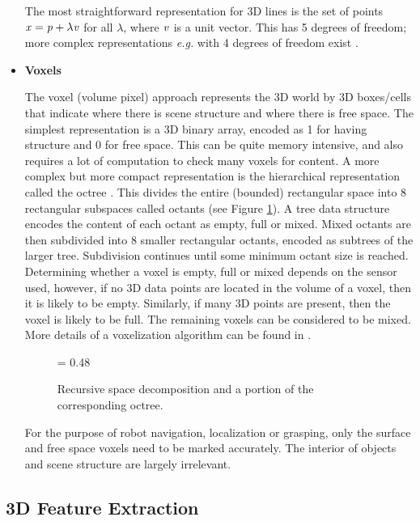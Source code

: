 \documentclass[twocolumn,oneside]{book}
\begin{document}
\begin{itemize}
The most straightforward representation for 3D lines is 
the set of points $ {\bf \it x} = {\bf \it p} + \lambda {\bf \it v}$ for all $\lambda$,
where ${\bf \it v}$ is a unit vector.
This has 5 degrees of freedom; more complex representations {\it e.g.} with
4 degrees of freedom exist \cite{hartley}.

\item {\bf Voxels}

The  voxel (volume pixel) approach represents the 3D world by 3D boxes/cells that
indicate where there is scene structure and where there is free space.
The simplest representation is a 3D binary array, encoded as 1 for having
structure and 0 for free space.
This can be quite memory intensive, and also requires a lot of computation to
check many voxels for content.
A more complex but more compact representation is the hierarchical 
representation called the octree \cite{foley}. This divides the entire (bounded)
rectangular space into 8 rectangular subspaces called octants 
(see Figure \ref{octree}).
A tree data structure encodes the content of each octant as empty,
full or mixed.
Mixed octants are then subdivided into 8 smaller rectangular octants,
encoded as subtrees of the larger tree.
Subdivision continues until some minimum octant size is reached.
Determining whether a voxel is empty, full or mixed depends on the sensor
used, however, if no 3D data points are located in the volume of a
voxel, then it is likely to be empty.
Similarly, if many 3D points are present, then the voxel is likely to 
be full.
The remaining voxels can be considered to be mixed.
More details of a voxelization algorithm can be found in \cite{Curless}.
\begin{figure}[htb]
{\epsfxsize = 0.48\textwidth {}}
\caption{Recursive space decomposition and a portion of the corresponding octree.
\label{octree}}
\end{figure}

For the purpose of robot navigation, localization or grasping, only the
surface and  free space voxels need to be marked accurately.
The interior of objects and scene structure are largely irrelevant.

\end{itemize}


\subsection{3D Feature Extraction} 
\label{3d_feature_extraction.ch22}
\end{document}
